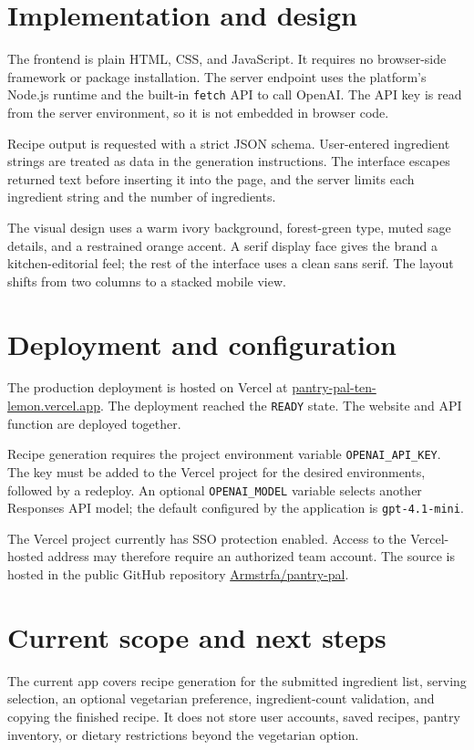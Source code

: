 \documentclass[11pt]{article}
\begin{document}
\section{Implementation and design}
The frontend is plain HTML, CSS, and JavaScript. It requires no browser-side framework or package installation. The server endpoint uses the platform's Node.js runtime and the built-in \texttt{fetch} API to call OpenAI. The API key is read from the server environment, so it is not embedded in browser code.

Recipe output is requested with a strict JSON schema. User-entered ingredient strings are treated as data in the generation instructions. The interface escapes returned text before inserting it into the page, and the server limits each ingredient string and the number of ingredients.

The visual design uses a warm ivory background, forest-green type, muted sage details, and a restrained orange accent. A serif display face gives the brand a kitchen-editorial feel; the rest of the interface uses a clean sans serif. The layout shifts from two columns to a stacked mobile view.

\section{Deployment and configuration}
The production deployment is hosted on Vercel at \href{https://pantry-pal-ten-lemon.vercel.app}{pantry-pal-ten-lemon.vercel.app}. The deployment reached the \texttt{READY} state. The website and API function are deployed together.

Recipe generation requires the project environment variable \texttt{OPENAI\_API\_KEY}. The key must be added to the Vercel project for the desired environments, followed by a redeploy. An optional \texttt{OPENAI\_MODEL} variable selects another Responses API model; the default configured by the application is \texttt{gpt-4.1-mini}.

The Vercel project currently has SSO protection enabled. Access to the Vercel-hosted address may therefore require an authorized team account. The source is hosted in the public GitHub repository \href{https://github.com/Armstrfa/pantry-pal}{Armstrfa/pantry-pal}.

\section{Current scope and next steps}
The current app covers recipe generation for the submitted ingredient list, serving selection, an optional vegetarian preference, ingredient-count validation, and copying the finished recipe. It does not store user accounts, saved recipes, pantry inventory, or dietary restrictions beyond the vegetarian option.
\end{document}
